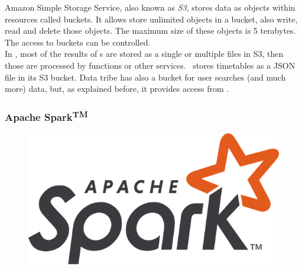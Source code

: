 Amazon Simple Storage Service\cite{s3}, also known as \textit{S3}, stores data as objects within resources called buckets. It allows store unlimited objects in a bucket, also write, read and delete those objects. The maximum size of these objects is 5 terabytes. The access to buckets can be controlled.
\\
In \company, most of the results of s are stored as a single or multiple files in S3, then those are processed by  functions or other services. \squad\ stores timetables as a JSON\cite{json} file in its S3 bucket. Data tribe has also a bucket for user searches (and much more) data, but, as explained before, it provides access from .

\subsubsection{Apache Spark\textsuperscript{TM}} \label{apache_spark}

\begin{figure}[H]
\includegraphics[scale=0.1]{resources/apache-spark_logo.png}
\end{figure}

